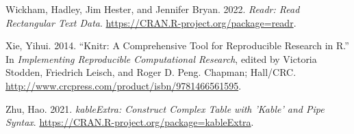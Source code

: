 \documentclass[
  letterpaper,
  DIV=11,
  numbers=noendperiod]{scrartcl}
\newlength{\cslhangindent}
\newlength{\cslentryspacingunit} %
\newenvironment{CSLReferences}[2] %
 {%
  \setlength{\parindent}{0pt}
  \ifodd #1
  \let\oldpar\par
  \def\par{\hangindent=\cslhangindent\oldpar}
  \fi
  \setlength{\parskip}{#2\cslentryspacingunit}
 }%
 {}
\begin{document}
\begin{CSLReferences}{1}{0}
\leavevmode{}%
Wickham, Hadley, Jim Hester, and Jennifer Bryan. 2022. \emph{Readr: Read
Rectangular Text Data}. \url{https://CRAN.R-project.org/package=readr}.

\leavevmode{}%
Xie, Yihui. 2014. {``Knitr: A Comprehensive Tool for Reproducible
Research in {R}.''} In \emph{Implementing Reproducible Computational
Research}, edited by Victoria Stodden, Friedrich Leisch, and Roger D.
Peng. Chapman; Hall/CRC.
\url{http://www.crcpress.com/product/isbn/9781466561595}.

\leavevmode{}%
Zhu, Hao. 2021. \emph{kableExtra: Construct Complex Table with 'Kable'
and Pipe Syntax}. \url{https://CRAN.R-project.org/package=kableExtra}.

\end{CSLReferences}
\end{document}
